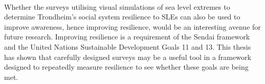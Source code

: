 \paragraph{}

Whether the surveys utilising visual simulations of sea level extremes to determine Trondheim's social system resilience to SLEs can also be used to improve awareness, hence improving resilience, would be an interesting avenue for future research. Improving resilience is a requirement of the Sendai framework and the United Nations Sustainable Development Goals 11 and 13. This thesis has shown that carefully designed surveys may be a useful tool in a framework designed to repeatedly measure resilience to see whether these goals are being met.


